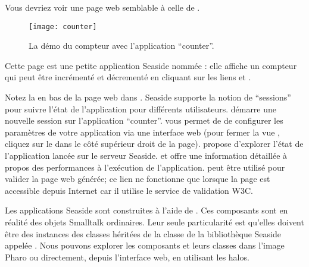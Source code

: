 \documentclass[a4paper,10pt,twoside]{book}
\begin{document}

\noindent
Vous devriez voir une page web semblable à celle de .

\noindent
{}


\begin{figure}[htb]
\begin{center}
\texttt{[image: counter]}
\caption{La démo du compteur avec l'application ``counter''.}
\end{center}
\end{figure}

\noindent
Cette page est une petite application Seaside nommée
: elle affiche un
compteur qui peut être incrémenté et décrementé en cliquant sur les
liens \link{++} et \link{--\,--}.

\noindent
{}

Notez la 
 en bas de la page web dans 
 .
Seaside supporte la notion de ``sessions'' pour suivre l'état de
l'application pour différents utilisateurs.
 démarre une nouvelle session sur l'application
``counter''.
 vous permet de 
de configurer les paramètres de votre application via une interface
web (pour fermer la vue , cliquez sur le 
dans le côté supérieur droit de la page).
 propose d'explorer l'état de l'application
lancée sur le serveur Seaside.
 et  offre une information détaillée 
à propos des performances à l'exécution de l'application.
 peut être utilisé pour valider la page web générée;
ce lien ne fonctionne que lorsque la page est accessible depuis
Internet car il utilise le service de validation W3C.


Les applications Seaside sont construites à l'aide de
.
Ces composants sont en réalité des objets Smalltalk ordinaires.
Leur seule particularité est qu'elles doivent être des instances des
classes héritées de la classe de la bibliothèque Seaside appelée
.
Nous pouvons explorer les composants et leurs classes dans l'image
Pharo ou directement, depuis l'interface web, en utilisant les halos.
\end{document}
